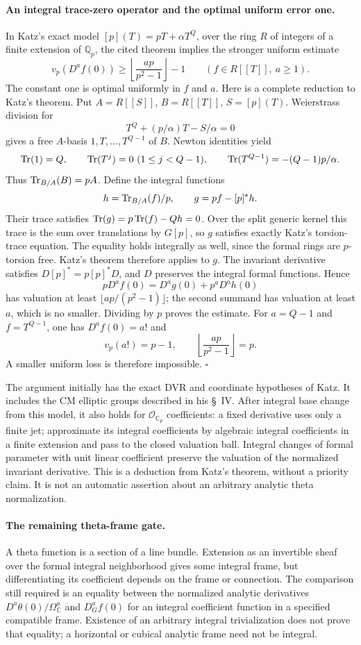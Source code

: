 \documentclass[11pt]{article}
\newcommand{\Q}{\mathbb Q}\newcommand{\C}{\mathbb C}\newcommand{\Z}{\mathbb Z}\newcommand{\R}{\mathbb R}\newcommand{\A}{\mathbb A}\newcommand{\OO}{\mathcal O}
\theoremstyle{definition}\newtheorem{definition}[theorem]{Definition}\newtheorem{remark}[theorem]{Remark}
\begin{document}
\paragraph{An integral trace-zero operator and the optimal uniform error one.}
In Katz's exact model $[p](T)=pT+\alpha T^Q$, over the ring $R$
of integers of a finite extension of $\Q_p$, the cited theorem
implies the stronger uniform estimate
\[
 v_p(D^af(0))\geq
       \left\lfloor\frac{ap}{p^2-1}\right\rfloor-1
       \qquad(f\in R[[T]],\ a\geq1).
\]
The constant one is optimal uniformly in $f$ and $a$.
Here is a complete reduction to Katz's theorem. Put
$A=R[[S]]$, $B=R[[T]]$, $S=[p](T)$. Weierstrass division for
\[
 T^Q+(p/\alpha)T-S/\alpha=0
\]
gives a free $A$-basis $1,T,\ldots,T^{Q-1}$ of $B$.
Newton identities yield
\[
 \operatorname{Tr}(1)=Q,\qquad \operatorname{Tr}(T^j)=0\ (1\leq j<Q-1),\qquad
 \operatorname{Tr}(T^{Q-1})=-(Q-1)p/\alpha.
\]
Thus $\operatorname{Tr}_{B/A}(B)=pA$. Define the integral functions
\[
 h=\operatorname{Tr}_{B/A}(f)/p,\qquad
 g=pf-[p]^*h.
\]
Their trace satisfies $\operatorname{Tr}(g)=p\operatorname{Tr}(f)-Qh=0$.
Over the split generic kernel this trace is the sum over translations
by $G[p]$, so $g$ satisfies exactly Katz's torsion-trace equation.
The equality holds integrally as well, since the formal rings are
$p$-torsion free. Katz's theorem therefore applies to $g$.
The invariant derivative satisfies $D[p]^*=p[p]^*D$, and $D$
preserves the integral formal functions. Hence
\[
 pD^af(0)=D^ag(0)+p^aD^ah(0)
\]
has valuation at least $\lfloor ap/(p^2-1)\rfloor$; the second
summand has valuation at least $a$, which is no smaller.
Dividing by $p$ proves the estimate. For $a=Q-1$ and
$f=T^{Q-1}$, one has $D^af(0)=a!$ and
\[
 v_p(a!)=p-1,
 \qquad\left\lfloor\frac{ap}{p^2-1}\right\rfloor=p.
\]
A smaller uniform loss is therefore impossible. $\square$

The argument initially has the exact DVR and coordinate hypotheses
of Katz. It includes the CM elliptic groups described in his \S~IV.
After integral base change from this model, it also holds for
$\mathcal O_{\C_p}$ coefficients: a fixed derivative uses only a
finite jet; approximate its integral coefficients by algebraic
integral coefficients in a finite extension and pass to the closed
valuation ball. Integral changes of formal parameter with unit
linear coefficient preserve the valuation of the normalized
invariant derivative. This is a deduction from Katz's theorem,
without a priority claim. It is not an automatic assertion about
an arbitrary analytic theta normalization.

\paragraph{The remaining theta-frame gate.}
A theta function is a section of a line bundle. Extension as an
invertible sheaf over the formal integral neighborhood gives some
integral frame, but differentiating its coefficient depends on the
frame or connection. The comparison still required is an equality
between the normalized analytic derivatives
$D^a\theta(0)/\Omega_{\C}^a$ and $D_G^af(0)$ for an integral
coefficient function in a specified compatible frame. Existence of
an arbitrary integral trivialization does not prove that equality;
a horizontal or cubical analytic frame need not be integral.
\end{document}
